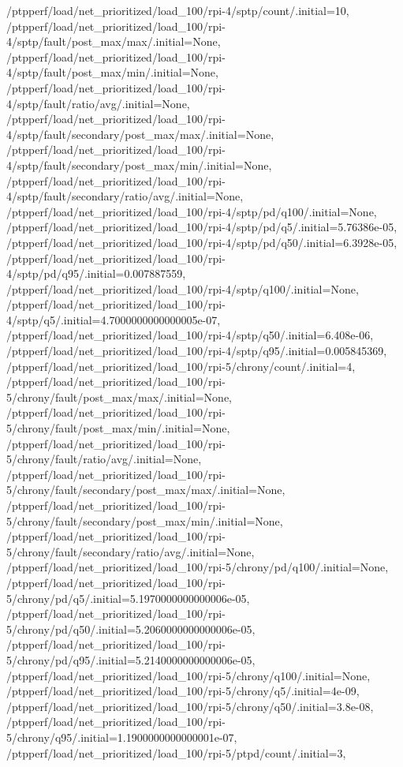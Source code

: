 {    /ptpperf/load/net_prioritized/load_100/rpi-4/sptp/count/.initial=10,
    /ptpperf/load/net_prioritized/load_100/rpi-4/sptp/fault/post_max/max/.initial=None,
    /ptpperf/load/net_prioritized/load_100/rpi-4/sptp/fault/post_max/min/.initial=None,
    /ptpperf/load/net_prioritized/load_100/rpi-4/sptp/fault/ratio/avg/.initial=None,
    /ptpperf/load/net_prioritized/load_100/rpi-4/sptp/fault/secondary/post_max/max/.initial=None,
    /ptpperf/load/net_prioritized/load_100/rpi-4/sptp/fault/secondary/post_max/min/.initial=None,
    /ptpperf/load/net_prioritized/load_100/rpi-4/sptp/fault/secondary/ratio/avg/.initial=None,
    /ptpperf/load/net_prioritized/load_100/rpi-4/sptp/pd/q100/.initial=None,
    /ptpperf/load/net_prioritized/load_100/rpi-4/sptp/pd/q5/.initial=5.76386e-05,
    /ptpperf/load/net_prioritized/load_100/rpi-4/sptp/pd/q50/.initial=6.3928e-05,
    /ptpperf/load/net_prioritized/load_100/rpi-4/sptp/pd/q95/.initial=0.007887559,
    /ptpperf/load/net_prioritized/load_100/rpi-4/sptp/q100/.initial=None,
    /ptpperf/load/net_prioritized/load_100/rpi-4/sptp/q5/.initial=4.7000000000000005e-07,
    /ptpperf/load/net_prioritized/load_100/rpi-4/sptp/q50/.initial=6.408e-06,
    /ptpperf/load/net_prioritized/load_100/rpi-4/sptp/q95/.initial=0.005845369,
    /ptpperf/load/net_prioritized/load_100/rpi-5/chrony/count/.initial=4,
    /ptpperf/load/net_prioritized/load_100/rpi-5/chrony/fault/post_max/max/.initial=None,
    /ptpperf/load/net_prioritized/load_100/rpi-5/chrony/fault/post_max/min/.initial=None,
    /ptpperf/load/net_prioritized/load_100/rpi-5/chrony/fault/ratio/avg/.initial=None,
    /ptpperf/load/net_prioritized/load_100/rpi-5/chrony/fault/secondary/post_max/max/.initial=None,
    /ptpperf/load/net_prioritized/load_100/rpi-5/chrony/fault/secondary/post_max/min/.initial=None,
    /ptpperf/load/net_prioritized/load_100/rpi-5/chrony/fault/secondary/ratio/avg/.initial=None,
    /ptpperf/load/net_prioritized/load_100/rpi-5/chrony/pd/q100/.initial=None,
    /ptpperf/load/net_prioritized/load_100/rpi-5/chrony/pd/q5/.initial=5.1970000000000006e-05,
    /ptpperf/load/net_prioritized/load_100/rpi-5/chrony/pd/q50/.initial=5.2060000000000006e-05,
    /ptpperf/load/net_prioritized/load_100/rpi-5/chrony/pd/q95/.initial=5.2140000000000006e-05,
    /ptpperf/load/net_prioritized/load_100/rpi-5/chrony/q100/.initial=None,
    /ptpperf/load/net_prioritized/load_100/rpi-5/chrony/q5/.initial=4e-09,
    /ptpperf/load/net_prioritized/load_100/rpi-5/chrony/q50/.initial=3.8e-08,
    /ptpperf/load/net_prioritized/load_100/rpi-5/chrony/q95/.initial=1.1900000000000001e-07,
    /ptpperf/load/net_prioritized/load_100/rpi-5/ptpd/count/.initial=3,
}
